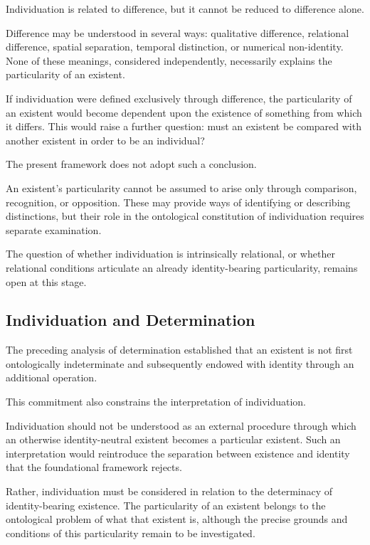 Individuation is related to difference, but it cannot be reduced to difference alone.

Difference may be understood in several ways: qualitative difference, relational difference, spatial separation, temporal distinction, or numerical non-identity. None of these meanings, considered independently, necessarily explains the particularity of an existent.

If individuation were defined exclusively through difference, the particularity of an existent would become dependent upon the existence of something from which it differs. This would raise a further question: must an existent be compared with another existent in order to be an individual?

The present framework does not adopt such a conclusion.

An existent's particularity cannot be assumed to arise only through comparison, recognition, or opposition. These may provide ways of identifying or describing distinctions, but their role in the ontological constitution of individuation requires separate examination.

The question of whether individuation is intrinsically relational, or whether relational conditions articulate an already identity-bearing particularity, remains open at this stage.

\subsection{Individuation and Determination}

The preceding analysis of determination established that an existent is not first ontologically indeterminate and subsequently endowed with identity through an additional operation.

This commitment also constrains the interpretation of individuation.

Individuation should not be understood as an external procedure through which an otherwise identity-neutral existent becomes a particular existent. Such an interpretation would reintroduce the separation between existence and identity that the foundational framework rejects.

Rather, individuation must be considered in relation to the determinacy of identity-bearing existence. The particularity of an existent belongs to the ontological problem of what that existent is, although the precise grounds and conditions of this particularity remain to be investigated.

